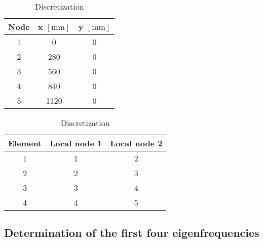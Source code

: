 \documentclass[12pt]{article}
\begin{document}
\begin{table}[hbt]
\label{tab:disc}
\captionsetup{justification=centering,position=top} %
\caption{Discretization} %
\begin{minipage}[t]{0.45\linewidth}
\centering
\captionsetup{justification=centering} %
\begin{tabular}{ c c c }
 Node & x $\left[ \text{mm} \right]$ & y $\left[ \text{mm} \right]$ \\
 \hline
 1 & 0 & 0 \\
 2 & 280 & 0 \\
 3 & 560 & 0 \\
 4 & 840 & 0 \\
 5 & 1120 & 0 \\
\end{tabular}
\label{tab:node-coordinates}
\end{minipage}
\quad
\begin{minipage}[t]{0.45\linewidth}
\centering
\captionsetup{justification=centering} %
\begin{tabular}{ c c c }
 Element & Local node 1 & Local node 2 \\
 \hline
 1 & 1 & 2 \\
 2 & 2 & 3 \\
 3 & 3 & 4 \\
 4 & 4 & 5 \\
\end{tabular}
\vspace{0.24 cm}
\label{tab:element-connectivity}
\end{minipage}
\end{table}
\vspace{-0.3cm}
\subsection{Determination of the first four eigenfrequencies}
\end{document}
